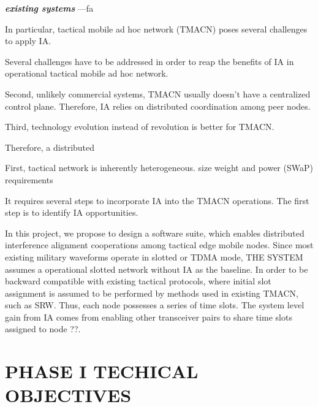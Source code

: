 \documentclass[letterpaper,11pt,onecolumn]{article}
\begin{document}
{\textbf{\textit{existing systems}}} ---fa



In particular, tactical mobile ad hoc network (TMACN) poses several challenges to apply IA. 

Several challenges have to be addressed in order to reap the benefits of IA in operational tactical mobile ad hoc network. 



Second, unlikely commercial systems, TMACN usually doesn't have a centralized control plane. Therefore, IA relies on distributed coordination among peer nodes. 

Third,  technology evolution instead of revolution is better for TMACN.

Therefore, a distributed 

First, tactical network is inherently heterogeneous.  size weight and power (SWaP) requirements 





It requires several steps to incorporate IA into the TMACN operations. The first step is to identify IA opportunities. 

In this project, we propose to design a software suite, which enables distributed interference alignment cooperations among tactical edge mobile nodes.  Since most existing military waveforms operate in slotted or TDMA mode, THE SYSTEM assumes a operational slotted network without IA as the baseline. In order to be backward compatible with existing tactical protocols,  where initial slot assignment is assumed to be performed by methods used in existing TMACN, such as SRW. Thus, each node possesses a series of time slots. The system level gain from IA comes from enabling other transceiver pairs to share time slots assigned to node ??. 

\section{PHASE I TECHICAL OBJECTIVES}
\end{document}

